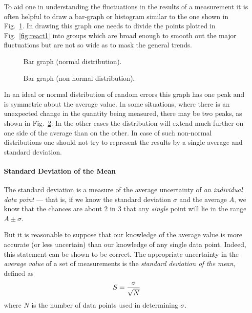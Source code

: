      To aid one in understanding the fluctuations in the results
of a measurement it is often helpful to draw a bar-graph or
histogram similar to the one shown in Fig.~\ref{fig:react2}.  In drawing this
graph one needs to divide the points plotted in Fig.~\ref{fig:react1} into
groups which are broad enough to smooth out the major
fluctuations but are not so wide as to mask the general trends.
\begin{figure}
\begin{center}
{}
\end{center}
\caption{Bar graph (normal distribution).  \label{fig:react2}}
\end{figure}
\begin{figure}
\begin{center}
{}
\end{center}
 \caption{Bar graph (non-normal distribution).  \label{fig:react3}}
\end{figure}
     In an ideal or normal distribution of random errors this
graph has one peak and is symmetric about the average value.  In
some situations, where there is an unexpected change in the
quantity being measured, there may be two peaks, as shown in
Fig.~\ref{fig:react3}.  In the other cases the distribution will extend much
further on one side of the average than on the other.  In case of
such non-normal distributions one should not try to represent the
results by a single average and standard deviation.

\paragraph*{Standard Deviation of the Mean}

     The standard deviation is a measure of the average
uncertainty of {\em an individual data point} --- that is, if we know the
standard deviation $\sigma$ and the average $A$, we know that the chances
are about 2 in 3 that any {\em single} point will lie in the range
$A \pm \sigma$.

But it is reasonable to suppose that our knowledge of
the average value is more accurate (or less uncertain)
than our knowledge of any single data point.
     Indeed, this statement can be shown to be correct.  The
appropriate uncertainty in the {\em average value} of a set of
measurements is the {\em standard deviation of the mean}, defined as
\begin{equation}
S = {{\sigma} \over {\sqrt{N}}}  \label{eq:react5}
\end{equation}
where $N$ is the number of data points used in determining $\sigma$.

